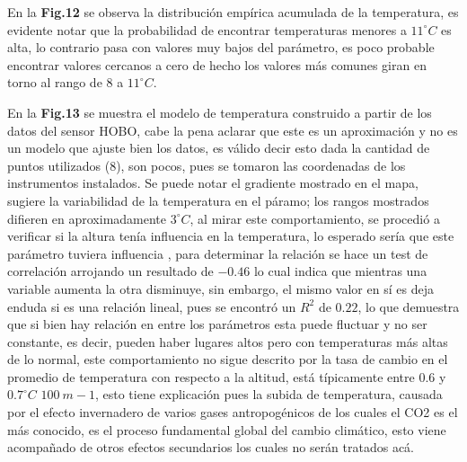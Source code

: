 \documentclass[conference,final,]{IEEEtran}
\begin{document}
En la \textbf{Fig.12} se observa la distribución empírica acumulada de
la temperatura, es evidente notar que la probabilidad de encontrar
temperaturas menores a \(11^{\circ}C\) es alta, lo contrario pasa con
valores muy bajos del parámetro, es poco probable encontrar valores
cercanos a cero de hecho los valores más comunes giran en torno al rango
de \(8\) a \(11^{\circ}C\).

En la \textbf{Fig.13} se muestra el modelo de temperatura construido a
partir de los datos del sensor HOBO, cabe la pena aclarar que este es un
aproximación y no es un modelo que ajuste bien los datos, es válido
decir esto dada la cantidad de puntos utilizados (\(8\)), son pocos,
pues se tomaron las coordenadas de los instrumentos instalados. Se puede
notar el gradiente mostrado en el mapa, sugiere la variabilidad de la
temperatura en el páramo; los rangos mostrados difieren en
aproximadamente \(3^{\circ}C\), al mirar este comportamiento, se
procedió a verificar si la altura tenía influencia en la temperatura, lo
esperado sería que este parámetro tuviera influencia \cite{basantes},
para determinar la relación se hace un test de correlación arrojando un
resultado de \(-0.46\) lo cual indica que mientras una variable aumenta
la otra disminuye, sin embargo, el mismo valor en sí es deja enduda si
es una relación lineal, pues se encontró un \(R^2\) de \(0.22\), lo que
demuestra que si bien hay relación en entre los parámetros esta puede
fluctuar y no ser constante, es decir, pueden haber lugares altos pero
con temperaturas más altas de lo normal, este comportamiento no sigue
descrito por \cite{van} la tasa de cambio en el promedio de temperatura
con respecto a la altitud, está típicamente entre \(0.6\) y
\(0.7^{\circ}C\) \(100 \ m-1\), esto tiene explicación pues la subida de
temperatura, causada por el efecto invernadero de varios gases
antropogénicos de los cuales el CO2 es el más conocido, es el proceso
fundamental global del cambio climático, esto viene acompañado de otros
efectos secundarios \cite{buyta} los cuales no serán tratados acá.
\end{document}
